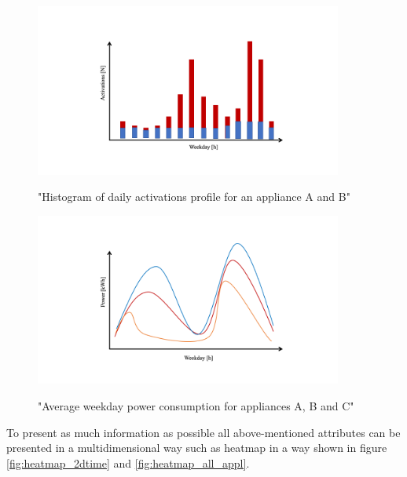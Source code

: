 \begin{figure}[H]
	\centering
	\caption{"Histogram of daily activations profile for an appliance A and B"}
	\includegraphics[width=0.9\textwidth]{Figures/profile_sketches/Slide8.png}
	\label{fig:daily_act_m_profile}
\end{figure}
\begin{figure}[H]
	\centering
	\caption{"Average weekday power consumption for appliances A, B and C"}
	\includegraphics[width=0.9\textwidth]{Figures/profile_sketches/Slide2.png}
	\label{fig:daily_power_m_profile}
\end{figure}

To present as much information as possible all above-mentioned attributes 
can be presented in a multidimensional way such as heatmap in a way shown in figure \ref{fig:heatmap_2dtime} and \ref{fig:heatmap_all_appl}.


